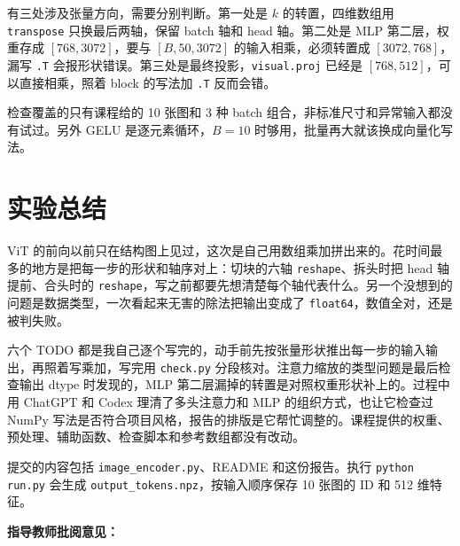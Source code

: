 \documentclass[a4paper,12pt]{article}
\begin{document}
有三处涉及张量方向，需要分别判断。第一处是 $k$ 的转置，四维数组用 \texttt{transpose} 只换最后两轴，保留 batch 轴和 head 轴。第二处是 MLP 第二层，权重存成 $[768,3072]$，要与 $[B,50,3072]$ 的输入相乘，必须转置成 $[3072,768]$，漏写 \texttt{.T} 会报形状错误。第三处是最终投影，\texttt{visual.proj} 已经是 $[768,512]$，可以直接相乘，照着 block 的写法加 \texttt{.T} 反而会错。

检查覆盖的只有课程给的 10 张图和 3 种 batch 组合，非标准尺寸和异常输入都没有试过。另外 GELU 是逐元素循环，$B=10$ 时够用，批量再大就该换成向量化写法。

\section{实验总结}

ViT 的前向以前只在结构图上见过，这次是自己用数组乘加拼出来的。花时间最多的地方是把每一步的形状和轴序对上：切块的六轴 \texttt{reshape}、拆头时把 head 轴提前、合头时的 \texttt{reshape}，写之前都要先想清楚每个轴代表什么。另一个没想到的问题是数据类型，一次看起来无害的除法把输出变成了 \texttt{float64}，数值全对，还是被判失败。

六个 TODO 都是我自己逐个写完的，动手前先按张量形状推出每一步的输入输出，再照着写乘加，写完用 \texttt{check.py} 分段核对。注意力缩放的类型问题是最后检查输出 dtype 时发现的，MLP 第二层漏掉的转置是对照权重形状补上的。过程中用 ChatGPT 和 Codex 理清了多头注意力和 MLP 的组织方式，也让它检查过 NumPy 写法是否符合项目风格，报告的排版是它帮忙调整的。课程提供的权重、预处理、辅助函数、检查脚本和参考数组都没有改动。

提交的内容包括 \texttt{image\_encoder.py}、README 和这份报告。执行 \texttt{python run.py} 会生成 \texttt{output\_tokens.npz}，按输入顺序保存 10 张图的 ID 和 512 维特征。

\newpage



\vspace{1cm}

\noindent \textbf{指导教师批阅意见：}
\vspace{6cm}
\hfill
\end{document}
